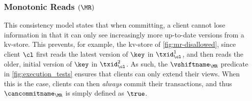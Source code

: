 \subsubsection{Monotonic Reads $(\MR)$}
This consistency model states that when committing, a client
cannot lose information in that it can only see increasingly more up-to-date versions from a kv-store.
This prevents, for example, the kv-store of \cref{fig:mr-disallowed},
since client $\cl$ first reads the latest version of $\key$ in $\txid_{\cl}^{1}$, 
and then reads the older, initial version of $\key$ in $\txid_{\cl}^{2}$.  
As such, the $\vshiftname_{\MR}$ predicate in \cref{fig:execution_tests} ensures that clients  can only extend their views. 
When this is the case, clients can then \emph{always} commit their transactions, and thus $\cancommitname_{\MR}$ is simply defined as $\true$. 
%
%


